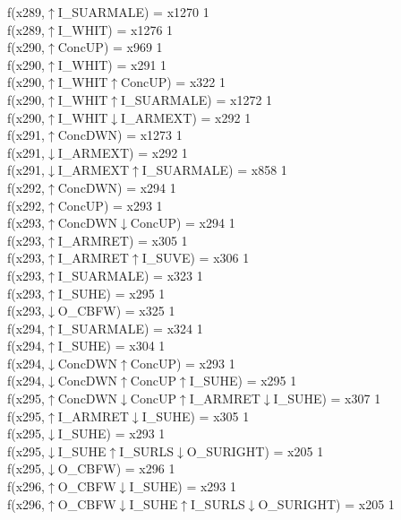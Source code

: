 f(x289,$\uparrow$I\_SUARMALE) = x1270 {1} \\
f(x289,$\uparrow$I\_WHIT) = x1276 {1} \\
f(x290,$\uparrow$ConcUP) = x969 {1} \\
f(x290,$\uparrow$I\_WHIT) = x291 {1} \\
f(x290,$\uparrow$I\_WHIT$\uparrow$ConcUP) = x322 {1} \\
f(x290,$\uparrow$I\_WHIT$\uparrow$I\_SUARMALE) = x1272 {1} \\
f(x290,$\uparrow$I\_WHIT$\downarrow$I\_ARMEXT) = x292 {1} \\
f(x291,$\uparrow$ConcDWN) = x1273 {1} \\
f(x291,$\downarrow$I\_ARMEXT) = x292 {1} \\
f(x291,$\downarrow$I\_ARMEXT$\uparrow$I\_SUARMALE) = x858 {1} \\
f(x292,$\uparrow$ConcDWN) = x294 {1} \\
f(x292,$\uparrow$ConcUP) = x293 {1} \\
f(x293,$\uparrow$ConcDWN$\downarrow$ConcUP) = x294 {1} \\
f(x293,$\uparrow$I\_ARMRET) = x305 {1} \\
f(x293,$\uparrow$I\_ARMRET$\uparrow$I\_SUVE) = x306 {1} \\
f(x293,$\uparrow$I\_SUARMALE) = x323 {1} \\
f(x293,$\uparrow$I\_SUHE) = x295 {1} \\
f(x293,$\downarrow$O\_CBFW) = x325 {1} \\
f(x294,$\uparrow$I\_SUARMALE) = x324 {1} \\
f(x294,$\uparrow$I\_SUHE) = x304 {1} \\
f(x294,$\downarrow$ConcDWN$\uparrow$ConcUP) = x293 {1} \\
f(x294,$\downarrow$ConcDWN$\uparrow$ConcUP$\uparrow$I\_SUHE) = x295 {1} \\
f(x295,$\uparrow$ConcDWN$\downarrow$ConcUP$\uparrow$I\_ARMRET$\downarrow$I\_SUHE) = x307 {1} \\
f(x295,$\uparrow$I\_ARMRET$\downarrow$I\_SUHE) = x305 {1} \\
f(x295,$\downarrow$I\_SUHE) = x293 {1} \\
f(x295,$\downarrow$I\_SUHE$\uparrow$I\_SURLS$\downarrow$O\_SURIGHT) = x205 {1} \\
f(x295,$\downarrow$O\_CBFW) = x296 {1} \\
f(x296,$\uparrow$O\_CBFW$\downarrow$I\_SUHE) = x293 {1} \\
f(x296,$\uparrow$O\_CBFW$\downarrow$I\_SUHE$\uparrow$I\_SURLS$\downarrow$O\_SURIGHT) = x205 {1} \\
